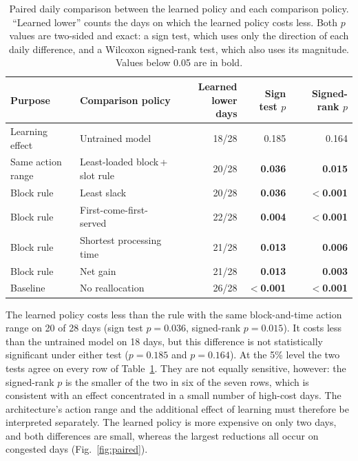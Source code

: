 \begin{table}[tbp]
\centering
\caption{Paired daily comparison between the learned policy and each
comparison policy. ``Learned lower'' counts the days on which the
learned policy costs less. Both $p$ values are two-sided and exact: a
sign test, which uses only the direction of each daily difference, and a
Wilcoxon signed-rank test, which also uses its magnitude. Values below
0.05 are in bold.}
\label{tab:paired}
\small
\setlength{\tabcolsep}{4pt}
\begin{tabular}{@{}>{\raggedright\arraybackslash}p{}>{\raggedright\arraybackslash}p{}rrr@{}}
\toprule
Purpose & Comparison policy & \shortstack{Learned lower\\days} &
\shortstack{Sign test\\$p$} & \shortstack{Signed-rank\\$p$} \\
\midrule
Learning effect & Untrained model & 18/28 & 0.185 & 0.164 \\
Same action range & Least-loaded block\,+\,slot rule & 20/28 & \textbf{0.036} & \textbf{0.015} \\
Block rule & Least slack & 20/28 & \textbf{0.036} & \textbf{$<$0.001} \\
Block rule & First-come-first-served & 22/28 & \textbf{0.004} & \textbf{$<$0.001} \\
Block rule & Shortest processing time & 21/28 & \textbf{0.013} & \textbf{0.006} \\
Block rule & Net gain & 21/28 & \textbf{0.013} & \textbf{0.003} \\
Baseline & No reallocation & 26/28 & \textbf{$<$0.001} & \textbf{$<$0.001} \\
\bottomrule
\end{tabular}
\end{table}
The learned policy costs less than the rule with the same block-and-time
action range on 20 of 28 days (sign test $p=0.036$, signed-rank
$p=0.015$). It costs less than the untrained model on 18 days, but this
difference is not statistically significant under either test ($p=0.185$ and
$p=0.164$). At the 5\% level the two tests agree on every row of
Table~\ref{tab:paired}. They are not equally sensitive, however: the
signed-rank $p$ is the smaller of the two in six of the seven rows, which
is consistent with an effect concentrated in a small number of high-cost
days. The architecture's
action range and the additional effect of learning must therefore be
interpreted separately. The learned policy is more expensive on only
two days, and both differences are small, whereas the largest reductions
all occur on congested days (Fig.~\ref{fig:paired}).

